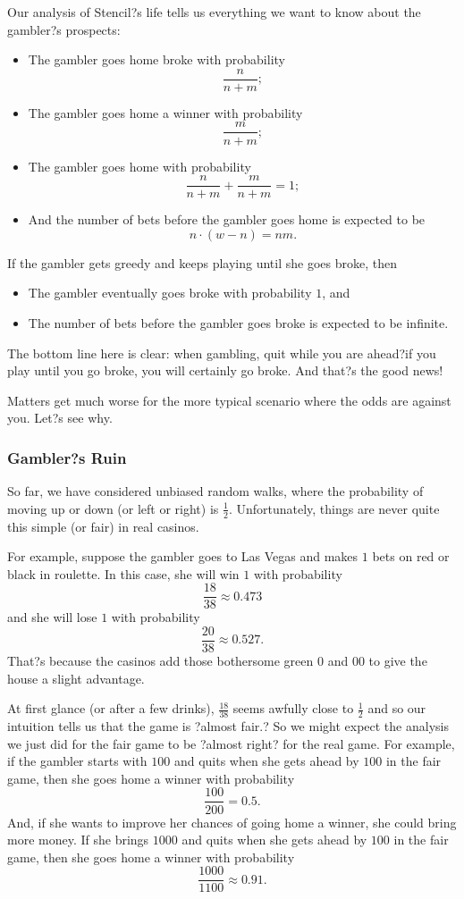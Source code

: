 \documentclass[12pt,a4paper]{article}
\begin{document}
		Our analysis of Stencil?s life tells us everything we want to know about the gambler?s prospects:
		\begin{itemize}
			\item The gambler goes home broke with probability
			\[
			\frac{n}{n + m};
			\]
			\item The gambler goes home a winner with probability
			\[
			\frac{m}{n + m};
			\]
			\item The gambler goes home with probability
			\[
			\frac{n}{n + m} + \frac{m}{n + m} = 1;
			\]
			\item And the number of bets before the gambler goes home is expected to be
			\[
			n \cdot (w - n) = nm.
			\]
		\end{itemize}
		
		If the gambler gets greedy and keeps playing until she goes broke, then
		\begin{itemize}
			\item The gambler eventually goes broke with probability $1$, and
			\item The number of bets before the gambler goes broke is expected to be infinite.
		\end{itemize}
		
		The bottom line here is clear: when gambling, quit while you are ahead?if you play until you go broke, you will certainly go broke. And that?s the good news!
		
		Matters get much worse for the more typical scenario where the odds are against you. Let?s see why.
		
		\subsubsection{Gambler?s Ruin}
		
		So far, we have considered unbiased random walks, where the probability of moving up or down (or left or right) is $\frac{1}{2}$. Unfortunately, things are never quite this simple (or fair) in real casinos.
		
		For example, suppose the gambler goes to Las Vegas and makes $1$ bets on red or black in roulette. In this case, she will win $1$ with probability
		\[
		\frac{18}{38} \approx 0.473
		\]
		and she will lose $1$ with probability
		\[
		\frac{20}{38} \approx 0.527.
		\]
		That?s because the casinos add those bothersome green 0 and 00 to give the house a slight advantage.
		
		At first glance (or after a few drinks), $\frac{18}{38}$ seems awfully close to $\frac{1}{2}$ and so our intuition tells us that the game is ?almost fair.? So we might expect the analysis we just did for the fair game to be ?almost right? for the real game. For example, if the gambler starts with $100$ and quits when she gets ahead by $100$ in the fair game, then she goes home a winner with probability
		\[
		\frac{100}{200} = 0.5.
		\]
		And, if she wants to improve her chances of going home a winner, she could bring more money. If she brings $1000$ and quits when she gets ahead by $100$ in the fair game, then she goes home a winner with probability
		\[
		\frac{1000}{1100} \approx 0.91.
		\]
		
\end{document}

